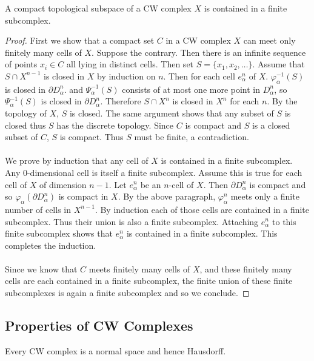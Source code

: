 \documentclass[a4paper]{article}
\begin{document}
\begin{prp}{}{} A compact topological subspace of a CW complex $X$ is contained in a finite subcomplex. \tcbline
\begin{proof}
First we show that a compact set $C$ in a CW complex $X$ can meet only finitely many cells of $X$. Suppose the contrary. Then there is an infinite sequence of points $x_i\in C$ all lying in distinct cells. Then set $S=\{x_1,x_2,\dots\}$. Assume that $S\cap X^{n-1}$ is closed in $X$ by induction on $n$. Then for each cell $e_\alpha^n$ of $X$. $\varphi_\alpha^{-1}(S)$ is closed in $\partial D_\alpha^n$. and $\Psi_\alpha^{-1}(S)$ consists of at most one more point in $D_\alpha^n$, so $\Psi_\alpha^{-1}(S)$ is closed in $\partial D_\alpha^n$. Therefore $S\cap X^n$ is closed in $X^n$ for each $n$. By the topology of $X$, $S$ is closed. The same argument shows that any subset of $S$ is closed thus $S$ has the discrete topology. Since $C$ is compact and $S$ is a closed subset of $C$, $S$ is compact. Thus $S$ must be finite, a contradiction. \\~\\

We prove by induction that any cell of $X$ is contained in a finite subcomplex. Any $0$-dimensional cell is itself a finite subcomplex. Assume this is true for each cell of $X$ of dimension $n-1$. Let $e_\alpha^n$ be an $n$-cell of $X$. Then $\partial D_\alpha^n$ is compact and so $\varphi_\alpha(\partial D_\alpha^n)$ is compact in $X$. By the above paragraph, $\varphi_\alpha^n$ meets only a finite number of cells in $X^{n-1}$. By induction each of those cells are contained in a finite subcomplex. Thus their union is also a finite subcomplex. Attaching $e_\alpha^n$ to this finite subcomplex shows that $e_\alpha^n$ is contained in a finite subcomplex. This completes the induction. \\~\\

Since we know that $C$ meets finitely many cells of $X$, and these finitely many cells are each contained in a finite subcomplex, the finite union of these finite subcomplexes is again a finite subcomplex and so we conclude. 
\end{proof}
\end{prp}

\subsection{Properties of CW Complexes}
\begin{prp}{}{} Every CW complex is a normal space and hence Hausdorff. 
\end{prp}
\end{document}
